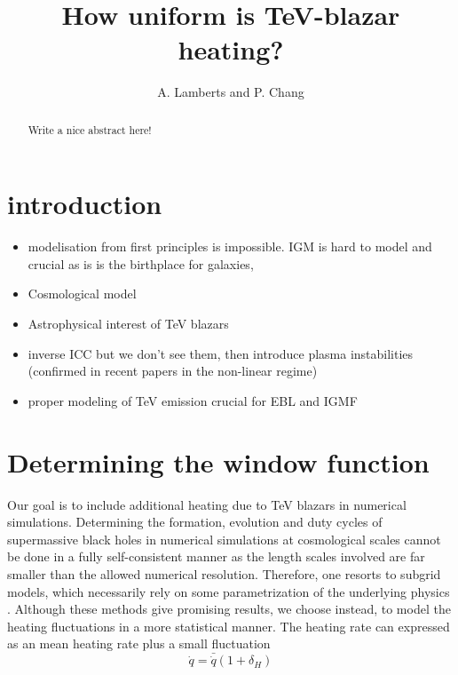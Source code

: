 \documentclass[twocolumns]{emulateapj}
\begin{document}
\title{How uniform is TeV-blazar heating?}

\author{A. Lamberts and P. Chang}


\begin{abstract}
Write a nice abstract here!


\end{abstract}

\section{introduction}
\begin{itemize}
\item modelisation from first principles is impossible. IGM is hard to model and crucial as is is the birthplace for galaxies,
\item Cosmological model
\item Astrophysical interest of TeV blazars
\item inverse ICC but we don't see them, then introduce plasma instabilities (confirmed in recent papers in the non-linear regime)
\item proper modeling of TeV emission crucial for EBL and IGMF
\end{itemize}
\section {Determining the window function}
Our goal is to include additional heating due to TeV blazars in numerical simulations. Determining the formation, evolution and duty cycles of supermassive black holes in numerical simulations at cosmological scales cannot be done in a fully self-consistent manner as the length scales involved are far smaller than the allowed numerical resolution. Therefore, one resorts to subgrid models, which necessarily rely on some parametrization of the underlying physics \citep{}. Although these methods give promising results, we choose instead, to model the heating fluctuations in a more statistical manner. The heating rate can expressed as an mean heating rate plus a small fluctuation
\begin{equation}
  \label{eq:delta_h}
  \dot{q}=\bar{\dot{q}}(1+\delta_H)
\end{equation}
\end{document}
